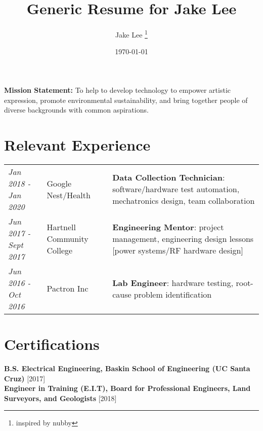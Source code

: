 \documentclass[12pt, letterpaper]{article}
\title{Generic Resume for Jake Lee}
\author{Jake Lee \thanks{inspired by nubby}}
\date{\today}
\begin{document}
	\begin{multicols}{2}
		\begin{center}
			\noindent
			\setlength{\fboxsep}{0.5cm}
		\end{center}
	\columnbreak
		\begin{flushleft}
			\parbox{0.5\textwidth}{
				\textbf{Mission Statement:} To help to develop technology to empower artistic expression, promote environmental sustainability, and bring together people of diverse backgrounds with common aspirations.
			}
		\end{flushleft}
	\end{multicols}
	\section*{Relevant Experience}
	\begin{center}
		\begin{tabular}{ m{2cm}	 m{6cm} | m{11cm} }
			\textit{Jan 2018 - Jan 2020} & 
			Google Nest/Health \newline [via Artech Information Systems] & 
			\textbf{Data Collection Technician}: software/hardware test automation, mechatronics design, team collaboration\\
			\textit{Jun 2017 - Sept 2017} & 
			Hartnell Community College & 
			\textbf{Engineering Mentor}: project management, engineering design lessons [power systems/RF hardware design]\\
			\textit{Jun 2016 - Oct 2016} & 
			Pactron Inc & 
			\textbf{Lab Engineer}: hardware testing, root-cause problem identification
		\end{tabular}
	\end{center}
	\section*{Certifications}
	\textbf{B.S. Electrical Engineering, Baskin School of Engineering (UC Santa Cruz)} [2017]\\
	\textbf{Engineer in Training (E.I.T), Board for Professional Engineers, Land Surveyors, and Geologists} [2018]
\end{document}

